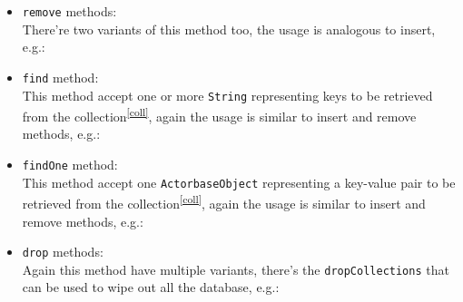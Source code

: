 \documentclass{scalatekids-article}
\begin{document}
{\begin{itemize}
    Insert methods could raise:
    \begin{itemize}
    \item \textbf{DuplicateKeyExc:} In case of a key already present inside the collection\textsuperscript{\ref{coll}}.
    \end{itemize}
  \item \verb=remove= methods:\\ There're two variants of this method too, the usage is
    analogous to insert, e.g.:
  \item \verb=find= method:\\ This method accept one or more \verb=String= representing
    keys to be retrieved from the collection\textsuperscript{\ref{coll}}, again the usage is similar to insert and
    remove methods, e.g.:
  \item \verb=findOne= method:\\ This method accept one \verb=ActorbaseObject= representing
    a key-value pair to be retrieved from the collection\textsuperscript{\ref{coll}}, again the usage is similar to insert and
    remove methods, e.g.:
  \item \verb=drop= methods:\\ Again this method have multiple variants, there's the
    \verb=dropCollections= that can be used to wipe out all the database, e.g.:

\end{itemize}}
\end{document}
